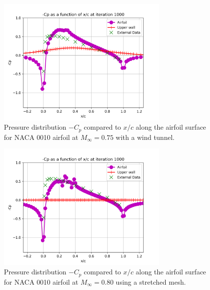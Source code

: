 \documentclass[12pt]{article}
\theoremstyle{definition}
\begin{document}
\begin{figure}
    \centering
    \includegraphics[width=0.75\textwidth,height=\textwidth,keepaspectratio]{images/pressure_coefficient-6.png}
    \caption{Pressure distribution $-C_p$ compared to $x/c$ along the airfoil surface for NACA 0010 airfoil at $M_\infty = 0.75$ with a wind tunnel.}
    \label{fig:pressure_coefficient-6}
\end{figure}

\begin{figure}
    \centering
    \includegraphics[width=0.75\textwidth,height=\textwidth,keepaspectratio]{images/pressure_coefficient-7.png}
    \caption{Pressure distribution $-C_p$ compared to $x/c$ along the airfoil surface for NACA 0010 airfoil at $M_\infty = 0.80$ using a stretched mesh.}
    \label{fig:pressure_coefficient-7}
\end{figure}
\end{document}
